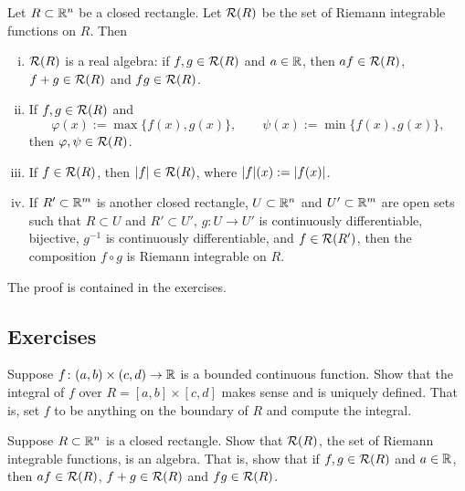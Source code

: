 \begin{cor} \label{cor:closednessofriemannintegrable}
Let $R \subset {\mathbb{R}}^n$ be a closed rectangle.  Let ${\mathcal{R}}(R)$ be the set
of Riemann integrable functions on $R$.  Then
\begin{enumerate}[(i)]
\item
${\mathcal{R}}(R)$ is a real algebra:
if $f,g \in {\mathcal{R}}(R)$ and $a \in {\mathbb{R}}$, then $af \in {\mathcal{R}}(R)$, $f+g \in {\mathcal{R}}(R)$
and $fg \in {\mathcal{R}}(R)$.
\item
If $f,g \in {\mathcal{R}}(R)$ and
\begin{equation*}
\varphi(x) := \max \{ f(x) , g(x) \} ,
\qquad
\psi(x) := \min \{ f(x) , g(x) \} ,
\end{equation*}
then $\varphi, \psi \in {\mathcal{R}}(R)$.
\item
If $f \in {\mathcal{R}}(R)$, then $\lvert {f} \rvert \in {\mathcal{R}}(R)$, where $\lvert {f} \rvert(x) :=
\lvert {f(x)} \rvert$.
\item
If $R' \subset {\mathbb{R}}^m$ is another closed rectangle,
$U \subset {\mathbb{R}}^n$ and $U' \subset {\mathbb{R}}^m$ are open sets such that
$R \subset U$ and $R' \subset U'$,
$g \colon U \to U'$ is continuously differentiable, bijective,
$g^{-1}$ is continuously differentiable,
and $f \in {\mathcal{R}}(R')$,
then the composition $f \circ g$ is Riemann integrable on $R$.
\end{enumerate}
\end{cor}

The proof is contained in the exercises.

%

\subsection{Exercises}

\begin{exercise}
Suppose $f \colon (a,b) \times (c,d) \to {\mathbb{R}}$ is a bounded continuous
function.  Show that the integral of $f$ over $R = [a,b] \times [c,d]$ makes sense
and is uniquely defined.  That is, set $f$ to be anything on the boundary of
$R$ and compute the integral.
\end{exercise}

\begin{exercise}
Suppose $R \subset {\mathbb{R}}^n$ is a closed rectangle.  Show that ${\mathcal{R}}(R)$, the set
of Riemann integrable functions, is an algebra.  That is, show that
if $f,g \in {\mathcal{R}}(R)$ and $a \in {\mathbb{R}}$, then $af \in {\mathcal{R}}(R)$, $f+g \in {\mathcal{R}}(R)$
and $fg \in {\mathcal{R}}(R)$.
\end{exercise}

